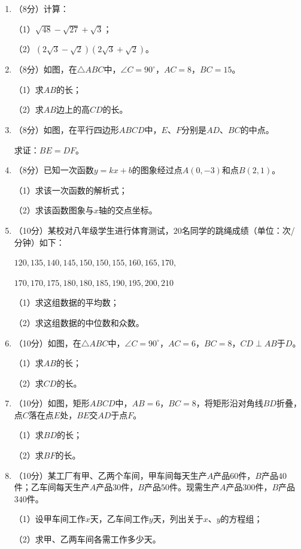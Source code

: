 \documentclass[12pt, a4paper]{ctexart}
\begin{document}
\begin{enumerate}[label=\arabic*., start=17]

\item （8分）计算：

（1）$\sqrt{48}-\sqrt{27}+\sqrt{3}$；

（2）$(2\sqrt{3}-\sqrt{2})(2\sqrt{3}+\sqrt{2})$。

\vspace{6cm}

\item （8分）如图，在$\triangle ABC$中，$\angle C=90^{\circ}$，$AC=8$，$BC=15$。

（1）求$AB$的长；

（2）求$AB$边上的高$CD$的长。

\vspace{6cm}

\item （8分）如图，在平行四边形$ABCD$中，$E$、$F$分别是$AD$、$BC$的中点。

求证：$BE=DF$。

\vspace{6cm}

\item （8分）已知一次函数$y=kx+b$的图象经过点$A(0,-3)$和点$B(2,1)$。

（1）求该一次函数的解析式；

（2）求该函数图象与$x$轴的交点坐标。

\vspace{6cm}

\item （10分）某校对八年级学生进行体育测试，$20$名同学的跳绳成绩（单位：次/分钟）如下：

$120,135,140,145,150,150,155,160,165,170,$

$170,170,175,180,180,185,190,195,200,210$

（1）求这组数据的平均数；

（2）求这组数据的中位数和众数。

\vspace{6cm}

\item （10分）如图，在$\triangle ABC$中，$\angle C=90^{\circ}$，$AC=6$，$BC=8$，$CD\perp AB$于$D$。

（1）求$AB$的长；

（2）求$CD$的长。

\vspace{6cm}

\item （10分）如图，矩形$ABCD$中，$AB=6$，$BC=8$，将矩形沿对角线$BD$折叠，点$C$落在点$E$处，$BE$交$AD$于点$F$。

（1）求$BD$的长；

（2）求$BF$的长。

\vspace{6cm}

\item （10分）某工厂有甲、乙两个车间，甲车间每天生产$A$产品$60$件，$B$产品$40$件；乙车间每天生产$A$产品$30$件，$B$产品$50$件。现需生产$A$产品$300$件，$B$产品$340$件。

（1）设甲车间工作$x$天，乙车间工作$y$天，列出关于$x$、$y$的方程组；

（2）求甲、乙两车间各需工作多少天。

\vspace{6cm}

\end{enumerate}
\end{document}
